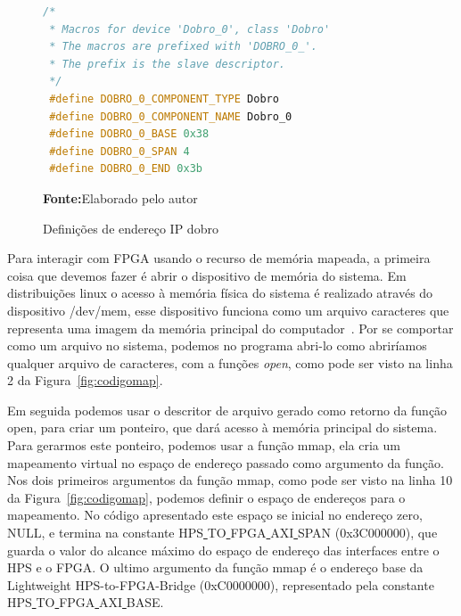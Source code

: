 \begin{figure}[ht]
\caption{Definições de endereço IP dobro}
\begin{center}
\begin{lstlisting}[language=C++, backgroundcolor=\color{gray!10}]
 /*
 * Macros for device 'Dobro_0', class 'Dobro'
 * The macros are prefixed with 'DOBRO_0_'.
 * The prefix is the slave descriptor.
 */
 #define DOBRO_0_COMPONENT_TYPE Dobro
 #define DOBRO_0_COMPONENT_NAME Dobro_0
 #define DOBRO_0_BASE 0x38
 #define DOBRO_0_SPAN 4
 #define DOBRO_0_END 0x3b
\end{lstlisting}
{\small \textbf{Fonte:}Elaborado pelo autor}	
\end{center}\label{fig:codigodobro}
\end{figure}


Para interagir com FPGA usando o recurso de memória mapeada, a primeira coisa que devemos fazer é abrir o dispositivo de memória do sistema. Em distribuições linux o acesso à memória física do sistema é realizado através do dispositivo /dev/mem, esse dispositivo funciona como um arquivo caracteres que representa uma imagem da memória principal do computador~\cite{manmem}. Por se comportar como um arquivo no sistema, podemos no programa abri-lo como abriríamos qualquer arquivo de caracteres, com a funções \textit{open}, como pode ser visto na linha 2 da Figura~\ref{fig:codigomap}.

Em seguida podemos usar o descritor de arquivo gerado como retorno da função open, para criar um ponteiro, que dará acesso à memória principal do sistema. Para gerarmos este ponteiro, podemos usar a função mmap, ela cria um mapeamento virtual no espaço de endereço passado como argumento da função. Nos dois primeiros argumentos da função mmap, como pode ser visto na linha 10 da Figura~\ref{fig:codigomap},  podemos definir o espaço de endereços para o mapeamento. No código apresentado este espaço se inicial no endereço zero, NULL\@, e termina na constante HPS\underline{ }TO\underline{ }FPGA\underline{ }AXI\underline{ }SPAN (0x3C000000), que guarda o valor do alcance máximo do espaço de endereço das interfaces entre o HPS e o FPGA\@. O ultimo argumento da função mmap é o endereço base da Lightweight HPS-to-FPGA-Bridge (0xC0000000), representado pela constante HPS\underline{ }TO\underline{ }FPGA\underline{ }AXI\underline{ }BASE.



